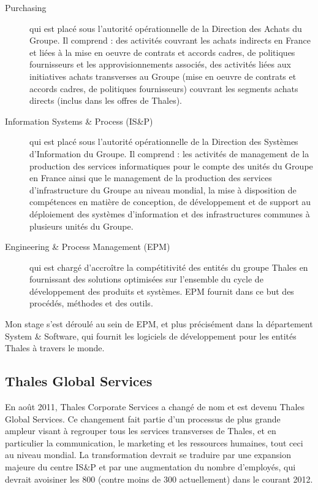 \begin{description}
\item[Purchasing] qui est placé sous l’autorité opérationnelle de la Direction 
des Achats du Groupe. Il comprend : des activités couvrant les achats indirects 
en France et liées à la mise en oeuvre de contrats et accords cadres, de 
politiques fournisseurs et les approvisionnements associés, des activités liées 
aux initiatives achats transverses au Groupe (mise en oeuvre de contrats et 
accords cadres, de politiques fournisseurs) couvrant les segments achats directs
(inclus dans les offres de Thales).
\item[Information Systems \& Process (IS\&P)] qui est placé sous l’autorité 
opérationnelle de la Direction des Systèmes d’Information du Groupe. Il 
comprend : les activités de management de la production des services 
informatiques pour le compte des unités du Groupe en France ainsi que le 
management de la production des services d’infrastructure du Groupe au niveau 
mondial, la mise à disposition de compétences en matière de conception, de 
développement et de support au déploiement des systèmes d’information et des 
infrastructures communes à plusieurs unités du Groupe.
\item[Engineering \& Process Management (EPM)] qui est chargé d’accroître la 
compétitivité des entités du groupe Thales en fournissant des solutions 
optimisées sur l’ensemble du cycle de développement des produits et systèmes. 
EPM fournit dans ce but des procédés, méthodes et des outils.
\end{description}

Mon stage s'est déroulé au sein de EPM, et plus précisément dans la département 
System \& Software, qui fournit les logiciels de développement pour les entités 
Thales à travers le monde. 

\subsection{Thales Global Services}

En août 2011, Thales Corporate Services a changé de nom et est devenu Thales Global Services. 
Ce changement fait partie d'un processus de plus grande ampleur visant à 
regrouper tous les services transverses de Thales, et en particulier la 
communication, le marketing et les ressources humaines, tout ceci au niveau 
mondial. La transformation devrait se traduire par une expansion majeure 
du centre IS\&P et par une augmentation du nombre d'employés, qui devrait 
avoisiner les 800 (contre moins de 300 actuellement) dans le courant 2012.